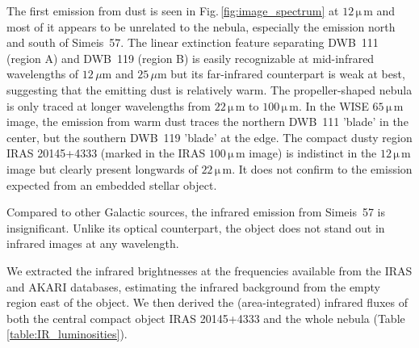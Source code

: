 \documentclass{aa}
\begin{document}
\par The first emission from dust is seen in
Fig.\,\ref{fig:image_spectrum} at $12\,\mathrm{\mu\,m}$ and most 
of it appears to
be unrelated to the nebula, especially the emission north and south of
Simeis~57. The linear extinction feature separating DWB~111 (region A)
and DWB~119 (region B) is easily recognizable at mid-infrared
wavelengths of $12\,\mu$m and $25\,\mu$m but its far-infrared
counterpart is weak at best, suggesting that the emitting dust is
relatively warm. The propeller-shaped nebula is only traced at longer
wavelengths from $22\,\mathrm{\mu\, m}$ to $100\,\mathrm{\mu\, m}$. 
In the WISE $65\,\mathrm{\mu\, m}$
image, the emission from warm dust traces the northern DWB~111 'blade'
in the center, but the southern DWB~119 'blade' at the edge. The
compact dusty region IRAS 20145+4333 (marked in the IRAS 
$100\,\mathrm{\mu\, m}$ image) is indistinct in the 
$12\,\mathrm{\mu\, m}$ image but clearly present
longwards of $22\,\mathrm{\mu\, m}$. It does not confirm 
to the emission expected from an embedded stellar object.

\par Compared to other Galactic sources, the infrared emission from
Simeis~57 is insignificant. Unlike its optical counterpart, the object
does not stand out in infrared images at any wavelength.

We extracted the infrared brightnesses at the frequencies available
from the IRAS and AKARI databases, estimating the infrared background
from the empty region east of the object. We then derived the
(area-integrated) infrared fluxes of both the central compact object
IRAS 20145+4333 and the whole nebula
(Table\,\ref{table:IR_luminosities}).

\end{document}
